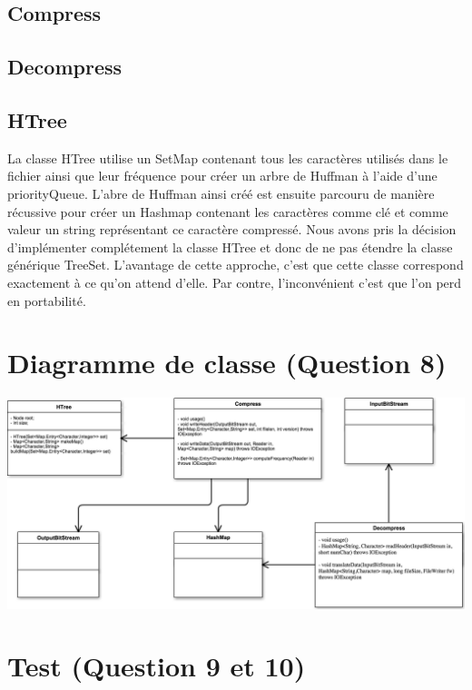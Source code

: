 \documentclass[10pt,a4paper]{article}
\begin{document}
\subsection*{Compress}


\subsection*{Decompress}


\subsection*{HTree}
La classe HTree utilise un SetMap contenant tous les caractères utilisés dans le fichier ainsi que leur fréquence pour créer un arbre de Huffman à l'aide d'une priorityQueue. L'abre de Huffman ainsi créé est ensuite parcouru de manière récussive pour créer un Hashmap contenant les caractères comme clé et comme valeur un string représentant ce caractère compressé.
Nous avons pris la décision d'implémenter complétement la classe HTree et donc de ne pas étendre la classe générique TreeSet. L'avantage de cette approche, c'est que cette classe correspond exactement à ce qu'on attend d'elle. Par contre, l'inconvénient c'est que l'on perd en portabilité.


\section*{Diagramme de classe (Question 8)}
\begin{center}
    \includegraphics[scale=0.4]{Class_Diagram.png}
\end{center}

\section*{Test (Question 9 et 10)}
\end{document}
